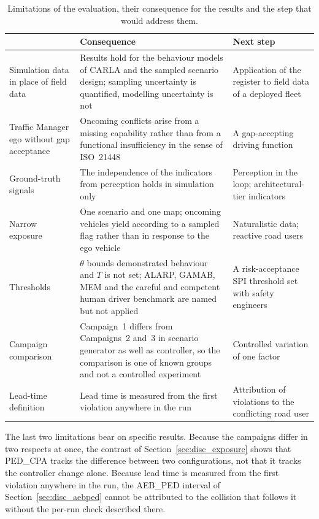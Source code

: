 \begin{table}[htbp]
    \centering
    \caption[Limitations of the evaluation]{Limitations of the evaluation, their consequence for the results and the step that would address them.}
    \label{tab:limitations}
    \footnotesize
    \setlength{\tabcolsep}{4pt}
    \begin{tabular}{@{}>{\raggedright\arraybackslash}p{3.4cm}>{\raggedright\arraybackslash}p{5.6cm}>{\raggedright\arraybackslash}p{4.6cm}@{}}
        \toprule
        {\bfseries Limitation} & {\bfseries Consequence} & {\bfseries Next step} \\
        \midrule
        Simulation data in place of field data &
        Results hold for the behaviour models of CARLA and the sampled scenario
        design; sampling uncertainty is quantified, modelling uncertainty is not &
        Application of the register to field data of a deployed fleet \\
        Traffic Manager ego without gap acceptance &
        Oncoming conflicts arise from a missing capability rather than from a
        functional insufficiency in the sense of ISO~21448 \cite{iso21448} &
        A gap-accepting driving function \\
        Ground-truth signals &
        The independence of the indicators from perception holds in simulation
        only &
        Perception in the loop; architectural-tier indicators \\
        Narrow exposure &
        One scenario and one map; oncoming vehicles yield according to a sampled flag
        rather than in response to the ego vehicle &
        Naturalistic data; reactive road users \\
        Thresholds &
        $\theta$ bounds demonstrated behaviour and $T$ is not set; ALARP, GAMAB, MEM
        and the careful and competent human driver benchmark are named but not
        applied &
        A risk-acceptance SPI threshold set with safety engineers \\
        Campaign comparison &
        Campaign~1 differs from Campaigns~2 and~3 in scenario generator as well as
        controller, so the comparison is one of known groups and not a controlled
        experiment &
        Controlled variation of one factor \\
        Lead-time definition &
        Lead time is measured from the first violation anywhere in the run &
        Attribution of violations to the conflicting road user \\
        \bottomrule
    \end{tabular}
\end{table}

The last two limitations bear on specific results. Because the campaigns differ
in two respects at once, the contrast of Section~\ref{sec:disc_exposure} shows
that PED\_CPA tracks the difference between two configurations, not that it
tracks the controller change alone. Because lead time is measured from the
first violation anywhere in the run, the AEB\_PED interval of
Section~\ref{sec:disc_aebped} cannot be attributed to the collision that follows
it without the per-run check described there.
